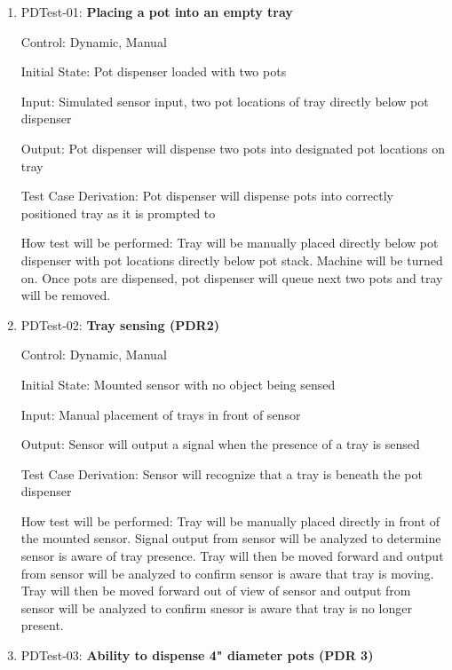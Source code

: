 \documentclass[12pt, titlepage]{article}
\begin{document}
\begin{enumerate}
 
  \item{PDTest-01: \textbf{Placing a pot into an empty tray\\}}
  
  Control: Dynamic, Manual
            
  Initial State: Pot dispenser loaded with two pots
            
  Input: Simulated sensor input, two pot locations of tray directly below pot dispenser
            
  Output: Pot dispenser will dispense two pots into designated pot locations on tray
  
  Test Case Derivation: Pot dispenser will dispense pots into correctly positioned tray as it is prompted to
            
  How test will be performed: Tray will be manually placed directly below pot dispenser with pot locations 
  directly below pot stack. Machine will be turned on. Once pots are dispensed, pot dispenser will 
  queue next two pots and tray will be removed.

  \item{PDTest-02: \textbf{Tray sensing (PDR2)}\\}
  
  Control: Dynamic, Manual
            
  Initial State: Mounted sensor with no object being sensed
            
  Input: Manual placement of trays in front of sensor
            
  Output: Sensor will output a signal when the presence of a tray is sensed
  
  Test Case Derivation: Sensor will recognize that a tray is beneath the pot dispenser
            
  How test will be performed: Tray will be manually placed directly in front of the mounted sensor. Signal 
  output from sensor will be analyzed to determine sensor is aware of tray presence. Tray will then be 
  moved forward and output from sensor will be analyzed to confirm sensor is aware that tray is moving. 
  Tray will then be moved forward out of view of sensor and output from sensor will be analyzed to confirm 
  snesor is aware that tray is no longer present.

  \item{PDTest-03: \textbf{Ability to dispense 4" diameter pots (PDR 3)}\\}
  

\end{enumerate}
\end{document}

